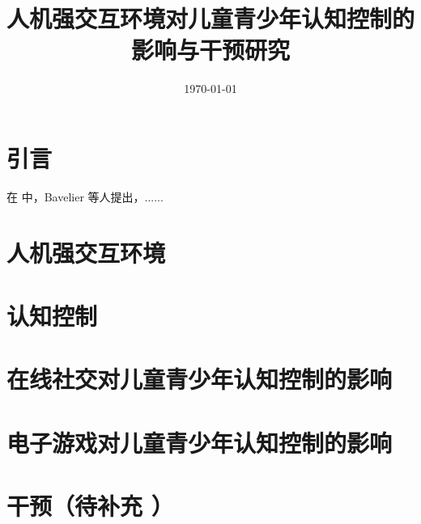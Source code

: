 \documentclass[12pt]{book}
\title{人机强交互环境对儿童青少年认知控制的影响与干预研究}
\author{}
\date{\today}
\begin{document}
 
\maketitle

\tableofcontents

\chapter{引言}


在\cite{bavelieretal2011} 中，Bavelier 等人提出，......

\chapter{人机强交互环境}


\chapter{认知控制}


\chapter{在线社交对儿童青少年认知控制的影响}


\chapter{电子游戏对儿童青少年认知控制的影响}


\chapter{干预（待补充 ）}








\end{document}
